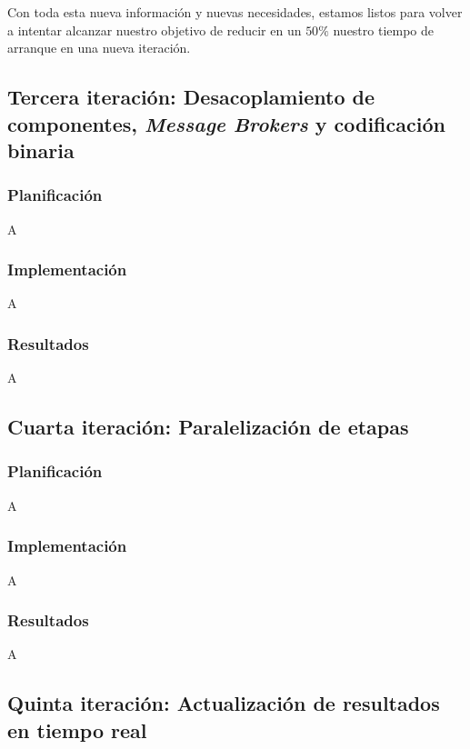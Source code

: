 Con toda esta nueva información y nuevas necesidades, estamos listos para volver a intentar alcanzar nuestro objetivo de reducir en un $50\%$ nuestro tiempo de arranque en una nueva iteración.

\subsection{Tercera iteración: Desacoplamiento de componentes, \textit{Message Brokers} y codificación binaria}

\subsubsection*{Planificación}

A

\subsubsection*{Implementación}

A

\subsubsection*{Resultados}

A

\subsection{Cuarta iteración: Paralelización de etapas}

\subsubsection*{Planificación}

A

\subsubsection*{Implementación}

A

\subsubsection*{Resultados}

A

\subsection{Quinta iteración: Actualización de resultados en tiempo real}

